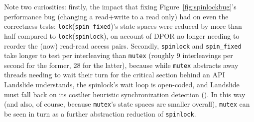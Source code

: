 Note two curiosities:
firstly,
the impact that fixing Figure~\ref{fig:spinlockbug}'s performance bug
(changing a read+write to a read only)
had on even the correctness tests:
{\tt lock}({\tt spin\_fixed})'s state spaces were reduced by more than half compared to {\tt lock}({\tt spinlock}),
on account of DPOR no longer needing to reorder the (now) read-read access pairs.
Secondly, {\tt spinlock} and {\tt spin\_fixed} take longer to test per interleaving
than {\tt mutex}
(roughly 9 interleavings per second for the former, 28 for the latter),
because while {\tt mutex} abstracts away threads needing to wait their turn for the critical section
behind an API Landslide understands,
the spinlock's wait loop is open-coded, and Landslide must fall back on its costlier heuristic synchronization detection
(\sect{\ref{sec:landslide-blocking}}).
In this way (and also, of course, because {\tt mutex}'s state spaces are smaller overall),
{\tt mutex} can be seen in turn as a further abstraction reduction of {\tt spinlock}.





